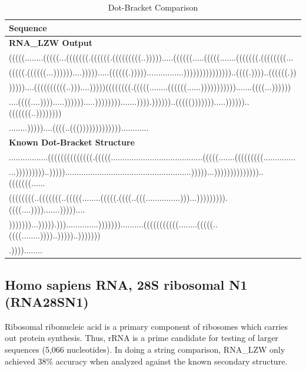 \documentclass[sigconf]{acmart}
\begin{document}
\begin{table}
  \caption{Dot-Bracket Comparison}
  \label{tab:telomerase}
  \begin{tabular}{l}
    \textbf{Sequence}\\
    \midrule
    \textbf{RNA\_LZW Output}\\
    (((((........(((((...(((((((.((((((.(((((((((..))))).....((((((.....(((((.......(((((((.((((((((...\\
    (((((.((((((...))))))....))))).....((((((.)))))................)))))))))))))))..((((.))))..((((((.))\\
    )))))....((((((((((..)))....)))))((((((((.(((((........((((((......))))))))))).......((((...))))))\\
    ....((((....)))).....)))))).....)))))))).......)))).))))))..((((())))))).....))))))..(((((((..))))))))\\
    ........)))))....((((..((()))))))))))))............\\
    \midrule 
    \textbf{Known Dot-Bracket Structure}\\
    .................((((((((((((((.(((((........................................(((((.......(((((((((..............\\
    ...)))))))))..))))).......................................................)))))...))))))))))))))..(((((((......\\
    ((((((((..(((((((..(((((........(((((.((((..(((...............)))...))))))))).((((....)))).......)))))....\\
    )))))))...))))).)))..............)))))))..........(((((((((((........(((((..((((........))))..)))))..)))))))\\
    .))))........
\end{tabular}
\end{table}

\subsection{Homo sapiens RNA, 28S ribosomal N1 (RNA28SN1)}

Ribosomal ribonucleic acid is a primary component of ribosomes which carries out protein synthesis. Thus, rRNA is a prime candidate for testing of larger sequences (5,066 nucleotides). 
In doing a string comparison, RNA\_LZW only achieved 38\% accuracy when analyzed against the known secondary structure. 
\end{document}
